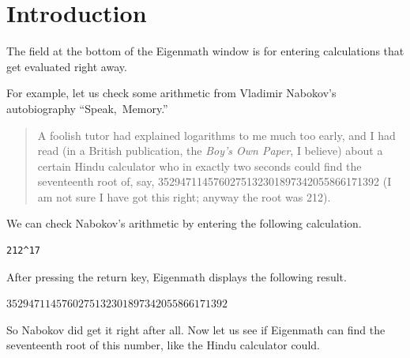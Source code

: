 \section{Introduction}

\noindent
The field at the bottom of the Eigenmath window is for entering
calculations that get evaluated right away.

\begin{center}
\end{center}

\noindent
For example, let us check some
arithmetic from Vladimir Nabokov's autobiography ``Speak,~Memory.''

\begin{quote}
A foolish tutor had explained logarithms to me much too early, and I had
read (in a British publication, the {\it Boy's Own Paper}, I believe)
about a certain Hindu calculator who in exactly two seconds could find the
seventeenth root of, say,
3529471145760275132301897342055866171392
(I am not sure I have got this right; anyway the root was 212).
\end{quote}

\noindent
We can check Nabokov's arithmetic by entering the following calculation.

{\color{blue}
\begin{verbatim}
212^17
\end{verbatim}
}

\noindent
After pressing the return key, Eigenmath displays the following result.

\bigskip
\noindent
$3529471145760275132301897342055866171392$

\bigskip
\noindent
So Nabokov did get it right after all.
Now let us see if Eigenmath can find the
seventeenth root of this number, like the Hindu calculator could.


